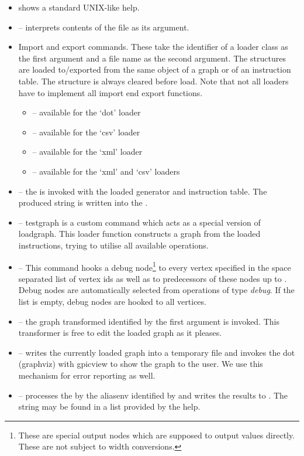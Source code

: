 \begin{itemize}
  \item {} shows a standard UNIX-like help.
  \item {} -- interprets contents of the file as its argument.
  \item Import and export commands. These take the identifier of a loader class as the first argument and a file name as the second argument. The structures are loaded to/exported from the same object of a graph or of an instruction table. The structure is always cleared before load. Note that not all loaders have to implement all import end export functions. 
  \begin{itemize}
    \item {} -- available for the `dot' loader
    \item {} -- available for the `csv' loader
    \item {} -- available for the `xml' loader
    \item {} -- available for the `xml' and `csv' loaders
  \end{itemize}
  \item {} -- the  is invoked with the loaded generator and instruction table. The produced string is written into the .
  \item {} -- testgraph is a custom command which acts as a special version of loadgraph. This loader function constructs a graph from the loaded instructions, trying to utilise all available operations.  
  \item {} -- This command hooks a debug node\footnote{These are special output nodes which are supposed to output values directly. These are not subject to width conversions.} to every vertex specified in the space separated list of vertex ids as well as to predecessors of these nodes up to . Debug nodes are automatically selected from operations of type \emph{debug}. If the list is empty, debug nodes are hooked to all vertices. 
  \item {} -- the graph transformed identified by the first argument is invoked. This transformer is free to edit the loaded graph as it pleases.
  \item {} -- writes the currently loaded graph into a temporary file and invokes the dot (graphviz) with gpicview to show the graph to the user. We use this mechanism for error reporting as well.
  \item {} -- processes the  by the aliasenv identified by  and writes the results to . The  string may be found in a list provided by the  help.
\end{itemize}
